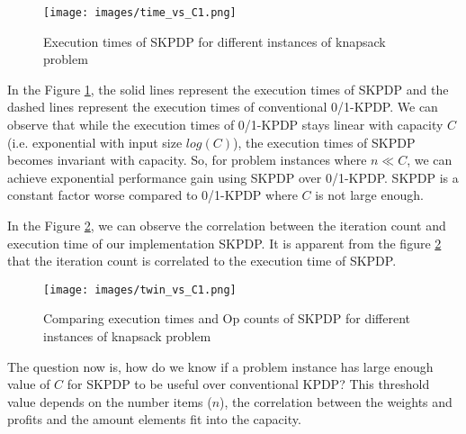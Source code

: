 \begin{figure}[htbp]
\centerline{\texttt{[image: images/time\_vs\_C1.png]}}
\caption{Execution times of SKPDP for different instances of knapsack problem}
\label{fig:time_vs_c1}
\end{figure}


In the Figure \ref{fig:time_vs_c1}, the solid lines represent the execution times of SKPDP and the dashed lines represent the execution times of conventional 0/1-KPDP. We can observe that while the execution times of 0/1-KPDP stays linear with capacity $C$ (i.e. exponential with input size $log(C)$), the execution times of SKPDP becomes invariant with capacity. So, for problem instances where $n \ll C$, we can achieve exponential performance gain using SKPDP over 0/1-KPDP. SKPDP is a constant factor worse compared to 0/1-KPDP where $C$ is not large enough.

In the Figure \ref{fig:twin_vs_c1}, we can observe the correlation between the iteration count and execution time of our implementation SKPDP. It is apparent from the figure \ref{fig:twin_vs_c1} that the iteration count is correlated to the execution time of SKPDP.

\begin{figure}[htbp]
\centerline{\texttt{[image: images/twin\_vs\_C1.png]}}
\caption{Comparing execution times and Op counts of SKPDP for different instances of knapsack problem}
\label{fig:twin_vs_c1}
\end{figure}

The question now is, how do we know if a problem instance has large enough value of $C$ for SKPDP to be useful over conventional KPDP? This threshold value depends on the number items ($n$), the correlation between the weights and profits and the amount elements fit into the capacity. 




